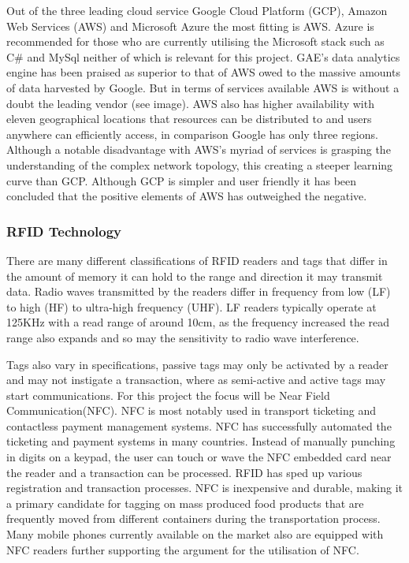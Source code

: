\documentclass[a4paper, 11pt]{article}
\begin{document}
Out of the three leading cloud service Google Cloud Platform (GCP), Amazon Web Services (AWS) and Microsoft Azure the most fitting is AWS. Azure is recommended for those who are currently utilising the Microsoft stack such as C\# and MySql neither of which is relevant for this project. GAE's data analytics engine has been praised as superior to that of AWS owed to the massive amounts of data harvested by Google.\cite{cays} \cite{HadoopInAction} But in terms of services available AWS is without a doubt the leading vendor (see image).  AWS also has higher availability with eleven geographical locations that resources can be distributed to and users anywhere can efficiently access, in comparison Google has only three regions. Although a notable disadvantage with AWS's myriad of services is grasping the understanding of the complex network topology, this creating a steeper learning curve than GCP. Although GCP is simpler and user friendly it has been concluded that the positive elements of AWS has outweighed the negative.

\subsubsection{RFID Technology}
There are many different classifications of RFID readers and tags that differ in the amount of memory it can hold to the range and direction it may transmit data. Radio waves transmitted by the readers differ in frequency from low (LF) to high (HF) to ultra-high frequency (UHF). LF readers typically operate at 125KHz with a read range of around 10cm, as the frequency increased the read range also expands and so may the sensitivity to radio wave interference.

Tags also vary in specifications, passive tags may only be activated by a reader and may not instigate a transaction, where as semi-active and active tags may start communications. For this project the focus will be Near Field Communication(NFC). NFC is most notably used in transport ticketing and contactless payment management systems. NFC has successfully automated the ticketing and payment systems in many countries. Instead of manually punching in digits on a keypad, the user can touch or wave the NFC embedded card near the reader and a transaction can be processed. RFID has sped up various registration and transaction processes. NFC is inexpensive and durable, making it a primary candidate for tagging on mass produced food products that are frequently moved from different containers during the transportation process. Many mobile phones currently available on the market also are equipped with NFC readers further supporting the argument for the utilisation of NFC.
\end{document}
